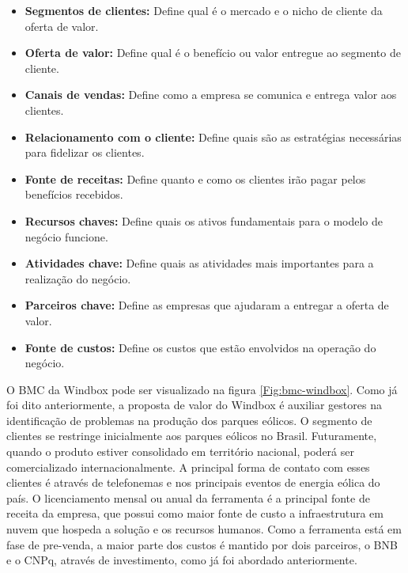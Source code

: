 \begin{itemize}
    \item \textbf{Segmentos de clientes:} Define qual é o mercado e o nicho de cliente da oferta de valor.
    \item \textbf{Oferta de valor:} Define qual é o benefício ou valor entregue ao segmento de cliente.
    \item \textbf{Canais de vendas:} Define como a empresa se comunica e entrega valor aos clientes.
    \item \textbf{Relacionamento com o cliente:} Define quais são as estratégias necessárias para fidelizar os clientes.
    \item \textbf{Fonte de receitas:} Define quanto e como os clientes irão pagar pelos benefícios recebidos.
    \item \textbf{Recursos chaves:} Define quais os ativos fundamentais para o modelo de negócio funcione.
    \item \textbf{Atividades chave:} Define quais as atividades mais importantes para a realização do negócio.
    \item \textbf{Parceiros chave:} Define as empresas que ajudaram a entregar a oferta de valor.
    \item \textbf{Fonte de custos:} Define os custos que estão envolvidos na operação do negócio.
\end{itemize}

O BMC da Windbox pode ser visualizado na figura \ref{Fig:bmc-windbox}. Como já foi dito anteriormente, a proposta de valor do Windbox é auxiliar gestores na identificação de problemas na produção dos parques eólicos. O segmento de clientes se restringe inicialmente aos parques eólicos no Brasil. Futuramente, quando o produto estiver consolidado em território nacional, poderá ser comercializado internacionalmente. A principal forma de contato com esses clientes é através de telefonemas e nos principais eventos de energia eólica do país. O licenciamento mensal ou anual da ferramenta é a principal fonte de receita da empresa, que possui como maior fonte de custo a infraestrutura em nuvem que hospeda a solução e os recursos humanos. Como a ferramenta está em fase de pre-venda, a maior parte dos custos é mantido por dois parceiros, o BNB e o CNPq, através de investimento, como já foi abordado anteriormente.

